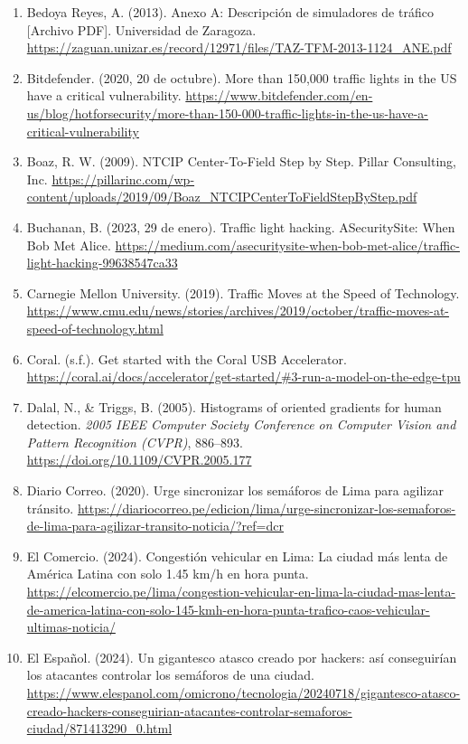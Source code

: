 \begin{enumerate}
\item
  Bedoya Reyes, A. (2013). Anexo A: Descripción de simuladores de tráfico {[}Archivo PDF{]}. Universidad de Zaragoza. \url{https://zaguan.unizar.es/record/12971/files/TAZ-TFM-2013-1124_ANE.pdf}
\item
  Bitdefender. (2020, 20 de octubre). More than 150,000 traffic lights in the US have a critical vulnerability. \url{https://www.bitdefender.com/en-us/blog/hotforsecurity/more-than-150-000-traffic-lights-in-the-us-have-a-critical-vulnerability}
\item
  Boaz, R. W. (2009). NTCIP Center-To-Field Step by Step. Pillar Consulting, Inc. \url{https://pillarinc.com/wp-content/uploads/2019/09/Boaz_NTCIPCenterToFieldStepByStep.pdf}
\item
  Buchanan, B. (2023, 29 de enero). Traffic light hacking. ASecuritySite: When Bob Met Alice. \url{https://medium.com/asecuritysite-when-bob-met-alice/traffic-light-hacking-99638547ca33}
\item
  Carnegie Mellon University. (2019). Traffic Moves at the Speed of Technology. \url{https://www.cmu.edu/news/stories/archives/2019/october/traffic-moves-at-speed-of-technology.html}
\item
  Coral. (s.f.). Get started with the Coral USB Accelerator. \url{https://coral.ai/docs/accelerator/get-started/#3-run-a-model-on-the-edge-tpu}
\item
  Dalal, N., \& Triggs, B. (2005). Histograms of oriented gradients for human detection. \emph{2005 IEEE Computer Society Conference on Computer Vision and Pattern Recognition (CVPR)}, 886--893. \url{https://doi.org/10.1109/CVPR.2005.177}
\item
  Diario Correo. (2020). Urge sincronizar los semáforos de Lima para agilizar tránsito. \url{https://diariocorreo.pe/edicion/lima/urge-sincronizar-los-semaforos-de-lima-para-agilizar-transito-noticia/?ref=dcr}
\item
  El Comercio. (2024). Congestión vehicular en Lima: La ciudad más lenta de América Latina con solo 1.45 km/h en hora punta. \url{https://elcomercio.pe/lima/congestion-vehicular-en-lima-la-ciudad-mas-lenta-de-america-latina-con-solo-145-kmh-en-hora-punta-trafico-caos-vehicular-ultimas-noticia/}
\item
  El Español. (2024). Un gigantesco atasco creado por hackers: así conseguirían los atacantes controlar los semáforos de una ciudad. \url{https://www.elespanol.com/omicrono/tecnologia/20240718/gigantesco-atasco-creado-hackers-conseguirian-atacantes-controlar-semaforos-ciudad/871413290_0.html}

\end{enumerate}
